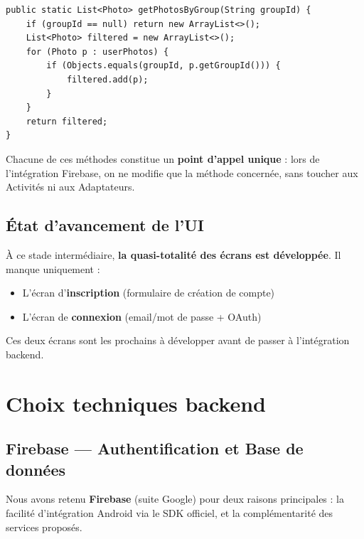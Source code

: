 \documentclass[a4paper,11pt]{article}
\newenvironment{codeblock}{
    \par\noindent\minipage{\linewidth}\vspace{4pt}
}{
    \vspace{4pt}\endminipage\par
}
\begin{document}
\begin{codeblock}
\begin{lstlisting}[caption={Exemple : filtrage des photos par groupe (null-safe)}]
public static List<Photo> getPhotosByGroup(String groupId) {
    if (groupId == null) return new ArrayList<>();
    List<Photo> filtered = new ArrayList<>();
    for (Photo p : userPhotos) {
        if (Objects.equals(groupId, p.getGroupId())) {
            filtered.add(p);
        }
    }
    return filtered;
}
\end{lstlisting}
\end{codeblock}

\noindent Chacune de ces méthodes constitue un \textbf{point d'appel unique} : lors de l'intégration Firebase, on ne modifie que la méthode concernée, sans toucher aux Activités ni aux Adaptateurs.

\subsection{État d'avancement de l'UI}

À ce stade intermédiaire, \textbf{la quasi-totalité des écrans est développée}. Il manque uniquement :

\begin{itemize}[leftmargin=1.5em]
    \item L'écran d'\textbf{inscription} (formulaire de création de compte)
    \item L'écran de \textbf{connexion} (email/mot de passe + OAuth)
\end{itemize}

Ces deux écrans sont les prochains à développer avant de passer à l'intégration backend.

\section{Choix techniques backend}

\subsection{Firebase — Authentification et Base de données}

Nous avons retenu \textbf{Firebase} (suite Google) pour deux raisons principales : la facilité d'intégration Android via le SDK officiel, et la complémentarité des services proposés.
\end{document}
